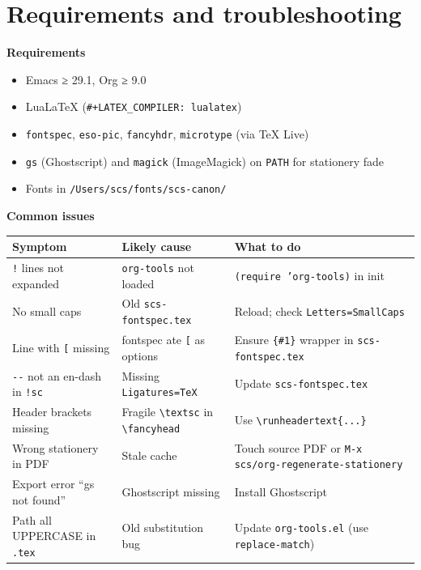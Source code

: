 \documentclass[11pt]{article}
\begin{document}
\section*{Requirements and troubleshooting}
\label{sec:org13f2b77}

\textbf{\textbf{Requirements}}

\begin{itemize}
\item Emacs ≥ 29.1, Org ≥ 9.0
\item LuaLaTeX (\texttt{\#+LATEX\_COMPILER: lualatex})
\item \texttt{fontspec}, \texttt{eso-pic}, \texttt{fancyhdr}, \texttt{microtype} (via \TeX{} Live)
\item \texttt{gs} (Ghostscript) and \texttt{magick} (ImageMagick) on \texttt{PATH} for stationery fade
\item Fonts in \texttt{/Users/scs/fonts/scs-canon/}
\end{itemize}

\textbf{\textbf{Common issues}}

\begin{center}
\begin{tabular}{lll}
Symptom & Likely cause & What to do\\
\hline
\texttt{!} lines not expanded & \texttt{org-tools} not loaded & \texttt{(require 'org-tools)} in init\\
No small caps & Old \texttt{scs-fontspec.tex} & Reload; check \texttt{Letters=SmallCaps}\\
Line with \texttt{[} missing & fontspec ate \texttt{[} as options & Ensure \texttt{\{\#1\}} wrapper in \texttt{scs-fontspec.tex}\\
\texttt{-{}-{}} not an en-dash in \texttt{!sc} & Missing \texttt{Ligatures=TeX} & Update \texttt{scs-fontspec.tex}\\
Header brackets missing & Fragile \texttt{\textbackslash{}textsc} in \texttt{\textbackslash{}fancyhead} & Use \texttt{\textbackslash{}runheadertext\{...\}}\\
Wrong stationery in PDF & Stale cache & Touch source PDF or \texttt{M-x scs/org-regenerate-stationery}\\
Export error “gs not found” & Ghostscript missing & Install Ghostscript\\
Path all UPPERCASE in \texttt{.tex} & Old substitution bug & Update \texttt{org-tools.el} (use \texttt{replace-match})\\
\end{tabular}
\end{center}
\end{document}
